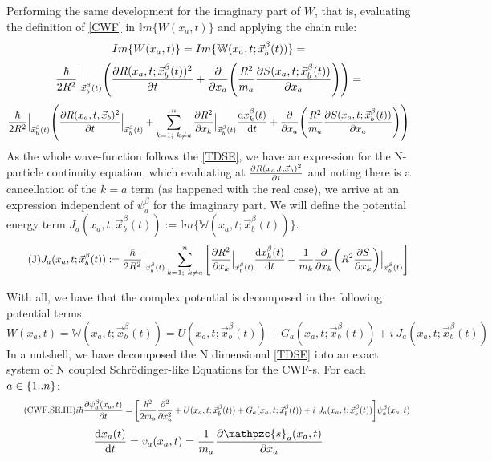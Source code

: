 \documentclass[11pt, a4paper]{article} %
\newcommand{\z}{\mathpzc{s}}
\newcommand{\W}{\mathbb{W}}
\begin{document}
Performing the same development for the imaginary part of $W$, that is, evaluating the definition of \ref{CWF} in $\mathbb{I}m\{W(x_a,t)\}$ and applying the chain rule:
$$
Im\{W(x_a,t)\}=Im\{\W(x_a,t; \vec{x}_b^\beta(t))\}=\vspace{-0.1cm}
$$
$$
\frac{\hbar}{2R^2}\Big\rvert_{\vec{x}_b^\beta(t)} \qty( \pdv{R(x_a,t;\vec{x}_b^\beta(t))^2}{t} + \pdv{}{x_a} \qty(\frac{R^2}{m_a} \pdv{S(x_a,t; \vec{x}_b^\beta(t))}{x_a} ))=\vspace{-0.1cm}
$$
$$
\frac{\hbar}{2R^2}\Big\rvert_{\vec{x}_b^\beta(t)} \qty( \pdv{R(x_a,t, \vec{x}_b)^2}{t}\Big\rvert_{\vec{x}_b^\beta(t)} + \sum_{k=1;\ k \neq a}^n \pdv{R^2}{x_k}\Big\rvert_{\vec{x}_b^\beta(t)} \dv{x_k^\beta(t)}{t} + \pdv{}{x_a} \qty(\frac{R^2}{m_a} \pdv{S(x_a,t; \vec{x}_b^\beta(t))}{x_a} ) )
$$
As the whole wave-function follows the \ref{TDSE}, we have an expression for the N-particle continuity equation, which evaluating at $\pdv{R(x_a,t, \vec{x}_b)^2}{t}$ and noting there is a cancellation of the $k=a$ term (as happened with the real case), we arrive at an expression independent of $\psi_a^\beta$ for the imaginary part. We will define the potential energy term $J_a(x_a,t; \vec{x}_b^\beta(t)):=\mathbb{I}m\{\W(x_a,t; \vec{x}_b^\beta(t))\}$.
\begin{equation}\label{J}\tag{J}
J_a(x_a,t; \vec{x}_b^\beta(t)):= \frac{\hbar}{2R^2}\Big\rvert_{\vec{x}_b^\beta(t)} \sum_{k=1;\ k \neq a}^n \qty[ \pdv{R^2}{x_k}\Big\rvert_{\vec{x}_b^\beta(t)} \dv{x_k^\beta(t)}{t} - \frac{1}{m_k} \pdv{}{x_k} \qty(R^2 \pdv{S}{x_k} )\Big\rvert_{\vec{x}_b^\beta(t)} ]
\end{equation}

With all, we have that the complex potential is decomposed in the following potential terms:
$$
W(x_a,t)=\W(x_a,t; \vec{x}_b^\beta(t))= U(x_a,t; \vec{x}_b^\beta(t)) + G_a(x_a,t; \vec{x}_b^\beta(t))+i\ J_a(x_a,t; \vec{x}_b^\beta(t))
$$
In a nutshell, we have decomposed the N dimensional \ref{TDSE} into an exact system of N coupled Schrödinger-like Equations for the CWF-s. For each $a \in \qty{1..n}$:
\begin{equation}\label{CWF.SE.III}\tag{CWF.SE.III}
i \hbar \pdv{\psi_a^\beta(x_a,t)}{t} = \qty[\frac{\hbar^2}{2m_a} \pdv[2]{}{x_a} +  U(x_a,t; \vec{x}_b^\beta(t)) + G_a(x_a,t; \vec{x}_b^\beta(t))+i\ J_a(x_a,t; \vec{x}_b^\beta(t))] \psi_a^\beta(x_a,t)
\end{equation}
\begin{equation*}
\begin{split}
\dv{x_a(t)}{t}=v_a(x_a,t)=\frac{1}{m_a}\pdv{\z_a(x_a, t)}{x_a}
\end{split}
\end{equation*}
\end{document}
